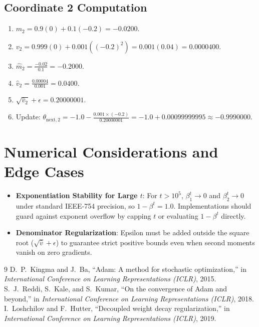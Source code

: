 \documentclass[11pt,a4paper]{article}
\theoremstyle{definition}
\begin{document}
\subsection{Coordinate 2 Computation}
\begin{enumerate}
    \item $m_2 = 0.9(0) + 0.1(-0.2) = -0.0200$.
    \item $v_2 = 0.999(0) + 0.001((-0.2)^2) = 0.001(0.04) = 0.0000400$.
    \item $\hat{m}_2 = \frac{-0.02}{0.1} = -0.2000$.
    \item $\hat{v}_2 = \frac{0.00004}{0.001} = 0.0400$.
    \item $\sqrt{\hat{v}_2} + \epsilon = 0.20000001$.
    \item Update: $\theta_{\text{next}, 2} = -1.0 - \frac{0.001 \times (-0.2)}{0.20000001} = -1.0 + 0.00099999995 \approx -0.9990000$.
\end{enumerate}

\section{Numerical Considerations and Edge Cases}

\begin{itemize}
    \item \textbf{Exponentiation Stability for Large $t$}: For $t > 10^5$, $\beta_1^t \to 0$ and $\beta_2^t \to 0$ under standard IEEE-754 precision, so $1 - \beta^t = 1.0$. Implementations should guard against exponent overflow by capping $t$ or evaluating $1 - \beta^t$ directly.
    \item \textbf{Denominator Regularization}: Epsilon must be added outside the square root ($\sqrt{\hat{v}} + \epsilon$) to guarantee strict positive bounds even when second moments vanish on zero gradients.
\end{itemize}

\begin{thebibliography}{9}
 D.~P.~Kingma and J.~Ba, ``Adam: A method for stochastic optimization,'' in \emph{International Conference on Learning Representations (ICLR)}, 2015.
 S.~J.~Reddi, S.~Kale, and S.~Kumar, ``On the convergence of Adam and beyond,'' in \emph{International Conference on Learning Representations (ICLR)}, 2018.
 I.~Loshchilov and F.~Hutter, ``Decoupled weight decay regularization,'' in \emph{International Conference on Learning Representations (ICLR)}, 2019.
\end{thebibliography}
\end{document}
